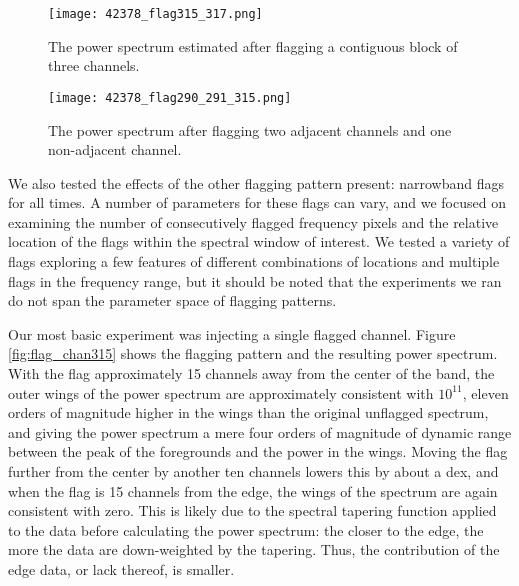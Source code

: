 \documentclass[12pt]{article}
\begin{document}
\begin{figure}[p]
	\centering
	\texttt{[image: 42378\_flag315\_317.png]}
	\caption[Power spectrum calculated with flagged time integrations and three contiguous flagged channels]{The power spectrum estimated after flagging a contiguous block of three channels.}
	\label{fig:flag_chan315_317}
\end{figure}

\begin{figure}[p]
	\centering
	\texttt{[image: 42378\_flag290\_291\_315.png]}
	\caption[Power spectrum calculated with flagged time integrations and three flagged channels (two contiguous, one not)]{The power spectrum after flagging two adjacent channels and one non-adjacent channel.}
	\label{fig:flag_chan290_291_315}
\end{figure}

We also tested the effects of the other flagging pattern present: narrowband flags for all times. A number of parameters for these flags can vary, and we focused on examining the number of consecutively flagged frequency pixels and the relative location of the flags within the spectral window of interest. We tested a variety of flags exploring a few features of different combinations of locations and multiple flags in the frequency range, but it should be noted that the experiments we ran do not span the parameter space of flagging patterns.

Our most basic experiment was injecting a single flagged channel. Figure \ref{fig:flag_chan315} shows the flagging pattern and the resulting power spectrum. With the flag approximately 15 channels away from the center of the band, the outer wings of the power spectrum are approximately consistent with $10^{11}$, eleven orders of magnitude higher in the wings than the original unflagged spectrum, and giving the power spectrum a mere four orders of magnitude of dynamic range between the peak of the foregrounds and the power in the wings. Moving the flag further from the center by another ten channels lowers this by about a dex, and when the flag is 15 channels from the edge, the wings of the spectrum are again consistent with zero. This is likely due to the spectral tapering function applied to the data before calculating the power spectrum: the closer to the edge, the more the data are down-weighted by the tapering. Thus, the contribution of the edge data, or lack thereof, is smaller.
\end{document}
